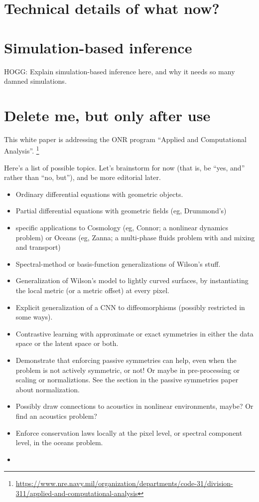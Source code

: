 \documentclass[11pt]{article}
\begin{document}



\appendix
\section{Technical details of what now?}

\section{Simulation-based inference}
HOGG: Explain simulation-based inference here, and why it needs so many damned simulations.

\section{Delete me, but only after use}
This white paper is addressing the ONR program ``Applied and Computational Analysis''.%
\footnote{\url{https://www.nre.navy.mil/organization/departments/code-31/division-311/applied-and-computational-analysis}}

Here's a list of possible topics.
Let's brainstorm for now (that is, be ``yes, and'' rather than ``no, but''), and be more editorial later.
\begin{itemize}
    \item Ordinary differential equations with geometric objects.
    \item Partial differential equations with geometric fields (eg, Drummond's)
    \item specific applications to Cosmology (eg, Connor; a nonlinear dynamics problem) or Oceans (eg, Zanna; a multi-phase fluids problem with and mixing and transport)
    \item Spectral-method or basis-function generalizations of Wilson's stuff.
    \item Generalization of Wilson's model to lightly curved surfaces, by instantiating the local metric (or a metric offset) at every pixel.
    \item Explicit generalization of a CNN to diffeomorphisms (possibly restricted in some ways).
    \item Contrastive learning with approximate or exact symmetries in either the data space or the latent space or both.
    \item Demonstrate that enforcing passive symmetries can help, even when the problem is not actively symmetric, or not! Or maybe in pre-processing or scaling or normaliztions. See the section in the passive symmetries paper about normalization.
    \item Possibly draw connections to acoustics in nonlinear environments, maybe? Or find an acoustics problem?
    \item Enforce conservation laws locally at the pixel level, or spectral component level, in the oceans problem.
    \item 
\end{itemize}
\end{document}
